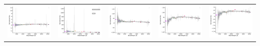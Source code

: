 \begin{center}
\begin{longtable}{l l l l l }
    \includegraphics[width=0.19\linewidth, clip]{Figs/Figs-lamost/spec-57330-EG220307N031056M01_sp07-205-STRIPE82-0132-050056.pdf} & \includegraphics[width=0.19\linewidth, clip]{Figs/Figs-lamost/spec-57454-HD120800N003716B02_sp08-055-SPLUS-n01s25-028549.pdf} & \includegraphics[width=0.19\linewidth, clip]{Figs/Figs-lamost/spec-57747-EG020648N012631M01_sp01-190-STRIPE82-0047-013896.pdf} & \includegraphics[width=0.19\linewidth, clip]{Figs/Figs-lamost/spec-56600-EG012606S021203F02_sp16-150-STRIPE82-0031-049213.pdf} & \includegraphics[width=0.19\linewidth, clip]{Figs/Figs-lamost/spec-56604-EG012606S021203F04_sp16-150-STRIPE82-0031-049213.pdf} \\

\end{longtable}
\end{center}

